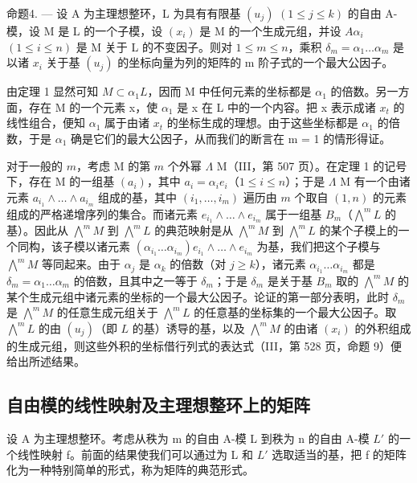 命题4. --- 设 A 为主理想整环，L 为具有有限基 \((u_{j})\) \((1 \leqslant j \leqslant k)\) 的自由 A-模，设 M 是 L 的一个子模，设 \((x_{i})\) 是 M 的一个生成元组，并设 \(A\alpha_{i}\) \((1 \leqslant i \leqslant n)\) 是 M 关于 L 的不变因子。则对 \(1 \leqslant m \leqslant n\)，乘积 \(\delta_{m} = \alpha_{1} \ldots \alpha_{m}\) 是以诸 \(x_{i}\) 关于基 \((u_{j})\) 的坐标向量为列的矩阵的 m 阶子式的一个最大公因子。

由定理 1 显然可知 \(M \subset \alpha_{1}L\)，因而 M 中任何元素的坐标都是 \(\alpha_{1}\) 的倍数。另一方面，存在 M 的一个元素 x，使 \(\alpha_{1}\) 是 x 在 L 中的一个内容。把 x 表示成诸 \(x_{t}\) 的线性组合，便知 \(\alpha_{1}\) 属于由诸 \(x_{t}\) 的坐标生成的理想。由于这些坐标都是 \(\alpha_{1}\) 的倍数，于是 \(\alpha_{1}\) 确是它们的最大公因子，从而我们的断言在 m = 1 的情形得证。

对于一般的 \(m\)，考虑 M 的第 \(m\) 个外幂 \(\Lambda\) M（III，第 507 页）。在定理 1 的记号下，存在 M 的一组基 \((a_i)\)，其中 \(a_i = \alpha_i e_i\)（\(1 \leqslant i \leqslant n\)）；于是 \(\Lambda\) M 有一个由诸元素 \(a_{i_1} \wedge \ldots \wedge a_{i_m}\) 组成的基，其中 \((i_1, \ldots, i_m)\) 遍历由 \(m\) 个取自 \((1, n)\) 的元素组成的严格递增序列的集合。而诸元素 \(e_{i_1} \wedge \ldots \wedge e_{i_m}\) 属于一组基 \(B_m\)（\(\bigwedge^m L\) 的基）。因此从 \(\bigwedge^m M\) 到 \(\bigwedge^m L\) 的典范映射是从 \(\bigwedge^m M\) 到 \(\bigwedge^m L\) 的某个子模上的一个同构，该子模以诸元素 \((\alpha_{i_1} \ldots \alpha_{i_m}) e_{i_1} \wedge \ldots \wedge e_{i_m}\) 为基，我们把这个子模与 \(\bigwedge^m M\) 等同起来。由于 \(\alpha_j\) 是 \(\alpha_k\) 的倍数（对 \(j \geqslant k\)），诸元素 \(\alpha_{i_1} \ldots \alpha_{i_m}\) 都是 \(\delta_m = \alpha_1 \ldots \alpha_m\) 的倍数，且其中之一等于 \(\delta_m\)；于是 \(\delta_m\) 是关于基 \(B_m\) 取的 \(\bigwedge^m M\) 的某个生成元组中诸元素的坐标的一个最大公因子。论证的第一部分表明，此时 \(\delta_m\) 是 \(\bigwedge^m M\) 的任意生成元组关于 \(\bigwedge^m L\) 的任意基的坐标集的一个最大公因子。取 \(\bigwedge^m L\) 的由 \((u_j)\)（即 \(L\) 的基）诱导的基，以及 \(\bigwedge^m M\) 的由诸 \((x_i)\) 的外积组成的生成元组，则这些外积的坐标借行列式的表达式（III，第 528 页，命题 9）便给出所述结果。

\subsection{自由模的线性映射及主理想整环上的矩阵}

设 A 为主理想整环。考虑从秩为 m 的自由 A-模 L 到秩为 n 的自由 A-模 \(L'\) 的一个线性映射 f。前面的结果使我们可以通过为 L 和 \(L'\) 选取适当的基，把 f 的矩阵化为一种特别简单的形式，称为矩阵的典范形式。

